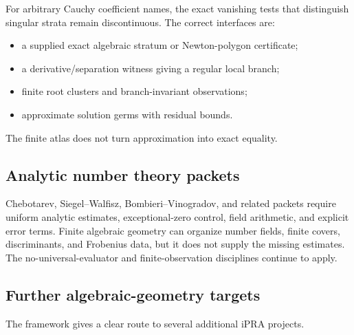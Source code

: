 For arbitrary Cauchy coefficient names, the exact vanishing tests that distinguish singular strata
remain discontinuous.  The correct interfaces are:

\begin{itemize}
\item a supplied exact algebraic stratum or Newton-polygon certificate;
\item a derivative/separation witness giving a regular local branch;
\item finite root clusters and branch-invariant observations;
\item approximate solution germs with residual bounds.
\end{itemize}

The finite atlas does not turn approximation into exact equality.

\subsection{Analytic number theory packets}

Chebotarev, Siegel--Walfisz, Bombieri--Vinogradov, and related packets require uniform analytic
estimates, exceptional-zero control, field arithmetic, and explicit error terms.  Finite algebraic
geometry can organize number fields, finite covers, discriminants, and Frobenius data, but it does
not supply the missing estimates.  The no-universal-evaluator and finite-observation disciplines
continue to apply.

\subsection{Further algebraic-geometry targets}

The framework gives a clear route to several additional iPRA projects.

